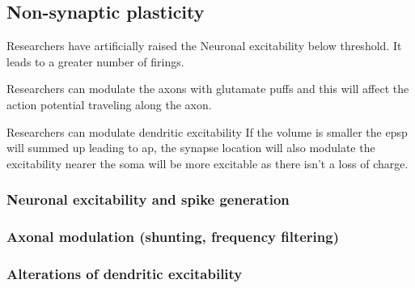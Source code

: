 \documentclass[main]{subfiles}
\begin{document}
\subsection{Non-synaptic plasticity}
Researchers have artificially raised the Neuronal excitability below threshold. It leads to a greater number of firings. 

Researchers can modulate the axons with glutamate puffs and this will affect the action potential traveling along the axon. 

Researchers can modulate dendritic excitability 
If the volume is smaller the epsp will summed up leading to ap, the synapse location will also modulate the excitability nearer the soma will be more excitable as there isn’t a loss of charge.

\subsubsection{Neuronal excitability and spike generation}
\subsubsection{Axonal modulation (shunting, frequency filtering)}
\subsubsection{Alterations of dendritic excitability}
\end{document}
